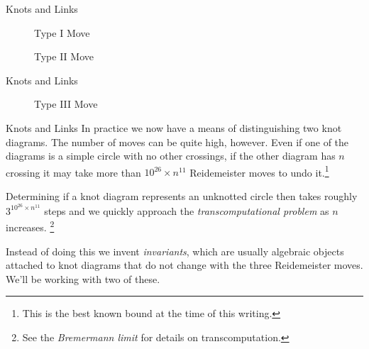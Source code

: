 \documentclass{beamer}
\begin{document}
    \begin{frame}{Knots and Links}
        \begin{figure}
            \centering
            \begin{minipage}[b]{0.49\textwidth}
                \centering
                \caption{Type I Move}
            \end{minipage}
            \hfill
            \begin{minipage}[b]{0.49\textwidth}
                \centering
                \caption{Type II Move}
            \end{minipage}
        \end{figure}
    \end{frame}
    \begin{frame}{Knots and Links}
        \begin{figure}
            \centering
            \caption{Type III Move}
        \end{figure}
    \end{frame}
    \begin{frame}{Knots and Links}
        In practice we now have a means of distinguishing two knot diagrams.
        The number of moves can be quite high, however. Even if one of the
        diagrams is a simple circle with no other crossings, if the other
        diagram has $n$ crossing it may take more than
        $10^{26}\times{n}^{11}$ Reidemeister moves to undo it.\footnote{%
            This is the best known bound at the time of this writing.
        }
        \par\hfill\par
        Determining if a knot diagram represents an unknotted circle then
        takes roughly $3^{10^{26}\times{n}^{11}}$ steps and we quickly
        approach the \textit{transcomputational problem} as $n$ increases.%
        \footnote{%
            See the \textit{Bremermann limit} for details on transcomputation.
        }
        \par\hfill\par
        Instead of doing this we invent \textit{invariants}, which are usually
        algebraic objects attached to knot diagrams that do not change with
        the three Reidemeister moves. We'll be working with two of these.
    \end{frame}
\end{document}
